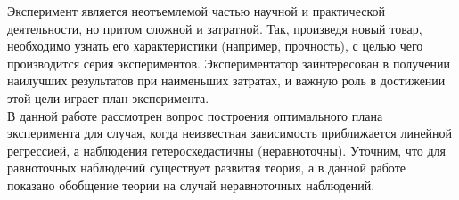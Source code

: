 
	Эксперимент является неотъемлемой частью научной и практической деятельности, но притом сложной и затратной. Так, произведя новый товар, необходимо узнать его характеристики (например, прочность), с целью чего производится серия экспериментов. Экспериментатор заинтересован в получении наилучших результатов при наименьших затратах, и важную роль в достижении этой цели играет план эксперимента.\\
	
	В данной работе рассмотрен вопрос  построения оптимального плана эксперимента для случая, когда неизвестная зависимость приближается линейной регрессией, а наблюдения гетероскедастичны (неравноточны). Уточним, что для равноточных наблюдений существует развитая теория, а в данной работе показано обобщение теории на случай неравноточных наблюдений.